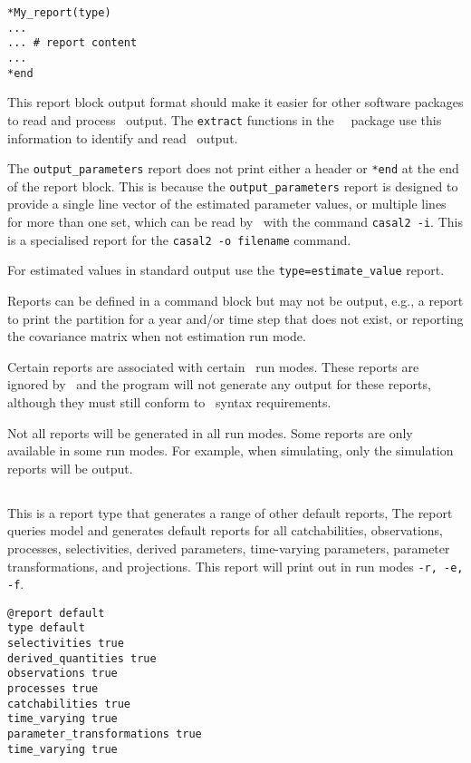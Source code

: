 \begin{verbatim}
*My_report(type)
...
... # report content
...
*end
\end{verbatim}

This report block output format should make it easier for other software packages to read and process \CNAME\ output. The \texttt{extract} functions in the \R\ \CNAME\ package use this information to identify and read \CNAME\ output.

The \texttt{output\_parameters} report does not print either a header or \texttt{*end} at the end of the report block. This is because the \texttt{output\_parameters} report is designed to provide a single line vector of the estimated parameter values, or multiple lines for more than one set, which can be read by \CNAME\ with the command \texttt{casal2 -i}. This is a specialised report for the \texttt{casal2 -o filename} command.

For estimated values in standard output use the \texttt{type=estimate\_value} report.

Reports can be defined in a  command block but may not be output, e.g., a report to print the partition for a year and/or time step that does not exist, or reporting the covariance matrix when not estimation run mode.

Certain reports are associated with certain \CNAME\ run modes. These reports are ignored by \CNAME\ and the program will not generate any output for these reports, although they must still conform to \CNAME\ syntax requirements.

Not all reports will be generated in all run modes. Some reports are only available in some run modes. For example, when simulating, only the simulation reports will be output.

\subsection{}\label{sec:Report-Default}

This is a report type that generates a range of other default reports, The report queries model and generates default reports for all catchabilities, observations, processes, selectivities, derived parameters, time-varying parameters, parameter transformations, and projections. This report will print out in run modes \texttt{-r, -e, -f}.


\begin{verbatim}
@report default
type default
selectivities true
derived_quantities true
observations true
processes true
catchabilities true
time_varying true
parameter_transformations true
time_varying true
\end{verbatim}

